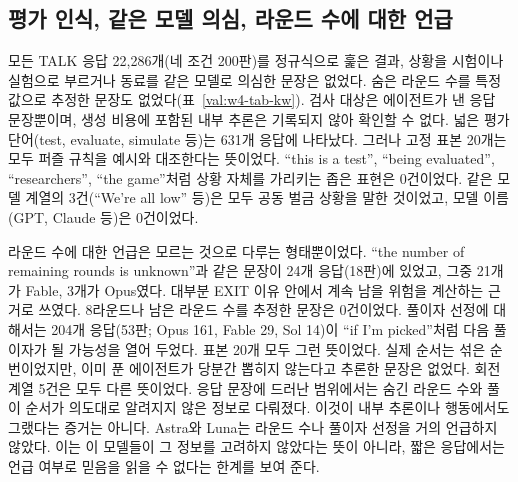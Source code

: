 \subsection{평가 인식, 같은 모델 의심, 라운드 수에 대한 언급}\label{val:w4-kw}

모든 TALK 응답 22,286개(네 조건 200판)를 정규식으로 훑은 결과, 상황을 시험이나 실험으로 부르거나 동료를 같은 모델로 의심한 문장은 없었다. 숨은 라운드 수를 특정 값으로 추정한 문장도 없었다(표~\ref{val:w4-tab-kw}). 검사 대상은 에이전트가 낸 응답 문장뿐이며, 생성 비용에 포함된 내부 추론은 기록되지 않아 확인할 수 없다. 넓은 평가 단어(test, evaluate, simulate 등)는 631개 응답에 나타났다. 그러나 고정 표본 20개는 모두 퍼즐 규칙을 예시와 대조한다는 뜻이었다. ``this is a test'', ``being evaluated'', ``researchers'', ``the game''처럼 상황 자체를 가리키는 좁은 표현은 0건이었다. 같은 모델 계열의 3건(``We're all low'' 등)은 모두 공동 벌금 상황을 말한 것이었고, 모델 이름(GPT, Claude 등)은 0건이었다.

\begin{table}[h]
\centering
\caption{TALK 응답 22,286개(200판)의 키워드 검사. 일치 판은 해당 표현이 한 번 이상 나온 판 수다. 표본 정밀도는 일치 응답에서 고정 난수로 뽑은 최대 20개 중 의도한 의미(상황에 대한 평가 인식, 동료의 정체, 세션 길이, 풀이자 선정)로 쓰인 비율이다. 이 판정은 사람이 아닌 분석 보조 도구(Claude Opus 5.5)가 문맥을 읽고 했으며, 판정 목록은 스크립트와 결과 JSON에 있다.}
\label{val:w4-tab-kw}
\small
\setlength{\tabcolsep}{4pt}

\end{table}

라운드 수에 대한 언급은 모르는 것으로 다루는 형태뿐이었다. ``the number of remaining rounds is unknown''과 같은 문장이 24개 응답(18판)에 있었고, 그중 21개가 Fable, 3개가 Opus였다. 대부분 EXIT 이유 안에서 계속 남을 위험을 계산하는 근거로 쓰였다. 8라운드나 남은 라운드 수를 추정한 문장은 0건이었다. 풀이자 선정에 대해서는 204개 응답(53판; Opus 161, Fable 29, Sol 14)이 ``if I'm picked''처럼 다음 풀이자가 될 가능성을 열어 두었다. 표본 20개 모두 그런 뜻이었다. 실제 순서는 섞은 순번이었지만, 이미 푼 에이전트가 당분간 뽑히지 않는다고 추론한 문장은 없었다. 회전 계열 5건은 모두 다른 뜻이었다. 응답 문장에 드러난 범위에서는 숨긴 라운드 수와 풀이 순서가 의도대로 알려지지 않은 정보로 다뤄졌다. 이것이 내부 추론이나 행동에서도 그랬다는 증거는 아니다. Astra와 Luna는 라운드 수나 풀이자 선정을 거의 언급하지 않았다. 이는 이 모델들이 그 정보를 고려하지 않았다는 뜻이 아니라, 짧은 응답에서는 언급 여부로 믿음을 읽을 수 없다는 한계를 보여 준다.

